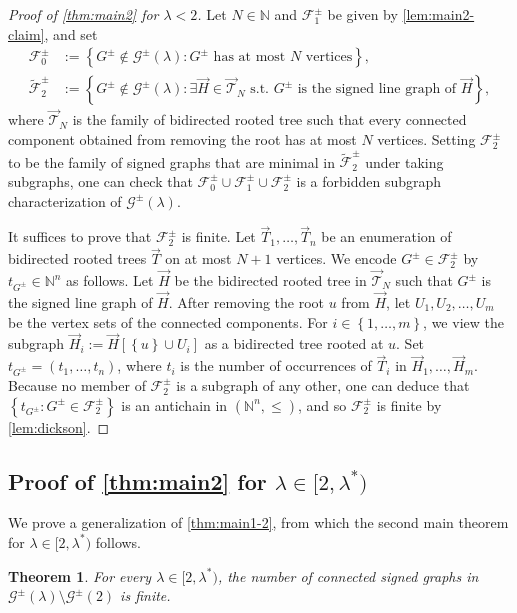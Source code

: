 \documentclass[11pt]{article}
\newtheorem{theorem}{Theorem}[section]
\theoremstyle{definition}
\theoremstyle{remark}
\newcommand{\dset}[2]{\left\{{#1}\colon{#2}\right\}}
\newcommand{\sset}[1]{\left\{{#1}\right\}}
\newcommand{\la}{\lambda}
\newcommand{\F}{\mathcal{F}}
\newcommand{\G}{\mathcal{G}}
\newcommand{\N}{\mathbb{N}}
\newcommand{\Gs}{\G^\pm(\la)}
\begin{document}
\begin{proof}[Proof of \cref{thm:main2} for $\la < 2$]
    Let $N \in \N$ and $\F_1^\pm$ be given by \cref{lem:main2-claim}, and set
    \begin{align*}
        \F_0^\pm & := \dset{G^\pm \not\in \Gs}{G^\pm \text{ has at most }N\text{ vertices}}, \\
        \widetilde{\F}_2^\pm & := \dset{G^\pm \not\in \Gs}{\exists \vec{H} \in \vec{\mathcal{T}}_N \text{ s.t. }G^\pm \text{ is the signed line graph of }\vec{H}},
    \end{align*}
    where $\vec{\mathcal{T}}_N$ is the family of bidirected rooted tree such that every connected component obtained from removing the root has at most $N$ vertices. Setting $\F_2^\pm$ to be the family of signed graphs that are minimal in $\widetilde{\F}_2^\pm$ under taking subgraphs, one can check that $\F_0^\pm \cup \F_1^\pm \cup \F_2^\pm$ is a forbidden subgraph characterization of $\Gs$.

    It suffices to prove that $\F_2^\pm$ is finite. Let $\vec{T}_1, \dots, \vec{T}_n$ be an enumeration of bidirected rooted trees $\vec{T}$ on at most $N+1$ vertices. We encode $G^\pm \in \F_2^\pm$ by $t_{G^\pm} \in \N^n$ as follows. Let $\vec{H}$ be the bidirected rooted tree in $\vec{\mathcal{T}}_N$ such that $G^\pm$ is the signed line graph of $\vec{H}$. After removing the root $u$ from $\vec{H}$, let $U_1, U_2, \dots, U_m$ be the vertex sets of the connected components. For $i \in \sset{1, \dots, m}$, we view the subgraph $\vec{H}_i := \vec{H}[\sset{u} \cup U_i]$ as a bidirected tree rooted at $u$. Set $t_{G^\pm} = (t_1, \dots, t_n)$, where $t_i$ is the number of occurrences of $\vec{T}_i$ in $\vec{H}_1, \dots, \vec{H}_m$. Because no member of $\F_2^\pm$ is a subgraph of any other, one can deduce that $\dset{t_{G^\pm}}{G^\pm \in \F_2^\pm}$ is an antichain in $(\N^n, \le)$, and so $\F_2^\pm$ is finite by \cref{lem:dickson}.
\end{proof}

\subsection{Proof of \texorpdfstring{\cref{thm:main2}}{the second main theorem} for \texorpdfstring{$\la \in [2, \la^*)$}{λ in [2, λ*)}}

We prove a generalization of \cref{thm:main1-2}, from which the second main theorem for $\la \in [2, \la^*)$ follows.

\begin{theorem} \label{thm:main2-2}
    For every $\la \in [2,\la^*)$, the number of connected signed graphs in $\Gs \setminus \G^\pm(2)$ is finite.
\end{theorem}
\end{document}

